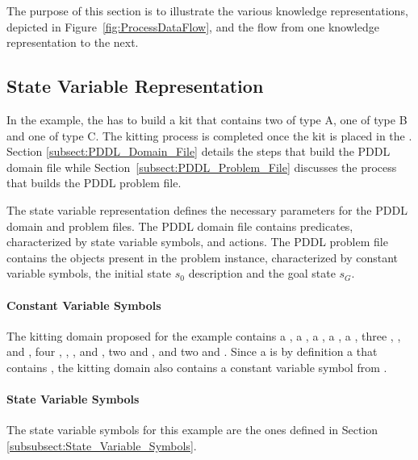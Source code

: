 The purpose of this section is to illustrate the various knowledge representations, depicted in Figure~\ref{fig:ProcessDataFlow}, and the flow from one knowledge representation to the next.

\subsection{State Variable Representation}

In the example, the  has to build a kit that contains two  of type A, one  of type B and one  of type C. The kitting process is completed once the kit is placed in the . Section \ref{subsect:PDDL_Domain_File} details the steps that build the PDDL domain file while Section~\ref{subsect:PDDL_Problem_File} discusses the process that builds the PDDL problem file.

The state variable representation defines the necessary parameters for the PDDL domain and problem files. The PDDL domain file contains predicates, characterized by state variable symbols, and actions. The PDDL problem file contains the objects present in the problem instance, characterized by constant variable symbols, the initial state $s_0$ description and the goal state $s_G$.

\paragraph{Constant Variable Symbols}
The kitting domain proposed for the example contains a  , a  , a  , a  , a  , three  , , and , four  , , , and , two   and , and two    and . Since a  is by definition a  that contains , the kitting domain also contains a constant variable symbol  from .

\paragraph{State Variable Symbols}
The state variable symbols for this example are the ones defined in Section \ref{subsubsect:State_Variable_Symbols}.

